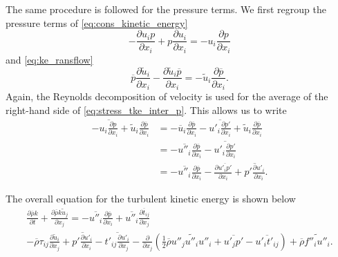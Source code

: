 \documentclass[oneside,a4paper,11pt]{report}
\newcommand{\rhoavg}{\overline{\rho}}
\newcommand{\pavg}{\overline{p}}
\newcommand{\tavg}{\overline{t}}
\newcommand{\uavg}{\overline{u}}
\newcommand{\pfluc}{p'}
\newcommand{\tfluc}{t'}
\newcommand{\ufluc}{u'}
\newcommand{\rs}{\tau}          %
\newcommand{\uavgf}{\widetilde{u}}
\newcommand{\fflucf}{f''}
\newcommand{\uflucf}{u''}
\begin{document}
The same procedure is followed for the pressure terms. We first regroup the pressure terms of \cref{eq:cons_kinetic_energy}
\begin{equation}
\label{eq:stress_tke_inter_p}
      -\frac{\partial u_i p }{\partial x_i} + p \frac{\partial u_i}{\partial x_i} =  -u_i \frac{\partial p }{\partial x_i}   
\end{equation}
and \cref{eq:ke_ransflow}
\begin{equation}
     \pavg \frac{ \partial \uavgf_i}{\partial x_i} - \frac{ \partial \uavgf_i \pavg }{\partial x_i} = -\uavgf_i \frac{ \partial \pavg}{\partial x_i}.    
\end{equation}
Again, the Reynolds decomposition of velocity is used for the average of the right-hand side of \cref{eq:stress_tke_inter_p}. This allows us to write
\begin{align}
-\overline{ u_i \frac{\partial p }{\partial x_i} } + \uavgf_i \frac{ \partial \pavg }{\partial x_i} & = -\uavg_i \frac{\partial \pavg}{\partial x_i} - \overline{ \ufluc_i \frac{\partial \pfluc}{\partial x_i} } + \uavgf_i \frac{\partial \pavg}{\partial x_i} \nonumber \\
& = - \overline{ \uflucf_i } \frac{\partial \pavg }{\partial x_i} - \overline{ \ufluc_i \frac{\partial \pfluc}{\partial x_i} } \nonumber \\
& = -\overline{ \uflucf_i } \frac{\partial \pavg }{\partial x_i} - \frac{\partial \overline{ \ufluc_i \pfluc } }{\partial x_i} + \overline{ \pfluc \frac{\partial \ufluc_i}{\partial x_i} }.
\end{align} 

The overall equation for the turbulent kinetic energy is shown below
\begin{multline}
\label{eq:ke_favre_conservation}
\frac{ \partial \rhoavg k }{ \partial t}  + \frac{ \partial \rhoavg k \uavgf_j }{ \partial x_j } = - \overline{ \uflucf_i } \frac{ \partial \pavg }{ \partial x_i } + \overline{ \uflucf_i } \frac{ \partial \tavg_{ij} }{ \partial x_j } \\
- \rhoavg \rs_{ij} \frac{ \partial \uavgf_i }{ \partial x_j}  + \overline{ \pfluc \frac{ \partial \ufluc_i } { \partial x_i } } - \overline{ \tfluc_{ij} \frac{ \partial \ufluc_i }{ \partial x_j } } - \frac{\partial}{ \partial x_j} \left ( \frac{1}{2} \rhoavg \widetilde{ \uflucf_j \uflucf_i \uflucf_i } + \overline{ \ufluc_j \pfluc }  - \overline{ \ufluc_i \tfluc_{ij} } \right ) + \rhoavg \widetilde{ \fflucf_i \uflucf_i }.
\end{multline}
\end{document}
